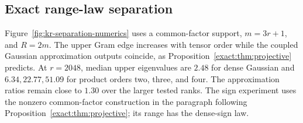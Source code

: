 \documentclass[11pt,a4paper]{article}
\theoremstyle{definition}\newtheorem{definition}[theorem]{Definition}
\theoremstyle{remark}\newtheorem{remark}[theorem]{Remark}
\numberwithin{equation}{section}
\begin{document}
\subsection{Exact range-law separation}
Figure~\ref{fig:kr-separation-numerics} uses a common-factor support,
$m=3r+1$, and $R=2m$. The upper Gram edge increases with tensor
order while the coupled Gaussian approximation outputs coincide,
as Proposition~\ref{exact:thm:projective} predicts.
At $r=2048$, median upper eigenvalues are $2.48$ for dense Gaussian
and $6.34,22.77,51.09$ for product orders two, three, and four.
The approximation ratios remain close to $1.30$ over the larger tested
ranks. The sign experiment uses the nonzero common-factor construction
in the paragraph following Proposition~\ref{exact:thm:projective};
its range has the dense-sign law.
\end{document}
